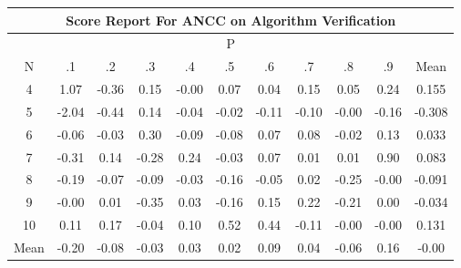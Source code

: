 \documentclass[11pt,a4paper]{report}
\begin{document}
\begin{longtable}{ | c || c | c | c | c | c | c | c | c | c || c |}
\hline
\multicolumn{11}{|c|}{ Score Report For ANCC on Algorithm Verification} \\
\hline
\multicolumn{11}{|c|}{ P } \\
\hline
N & .1 & .2 & .3 & .4 & .5 & .6 & .7 & .8 & .9 & Mean\\
 \hline
 \hline
 \endhead
  4 &  \cellcolor[HTML]{E7E7FF} 1.07 &  \cellcolor[HTML]{FFF7F7} -0.36 &  \cellcolor[HTML]{FFFFFF} 0.15 &  \cellcolor[HTML]{FFFFFF} -0.00 &  \cellcolor[HTML]{FFFFFF} 0.07 &  \cellcolor[HTML]{FFFFFF} 0.04 &  \cellcolor[HTML]{FFFFFF} 0.15 &  \cellcolor[HTML]{FFFFFF} 0.05 &  \cellcolor[HTML]{F7F7FF} 0.24 & 0.155 \\
  5 &  \cellcolor[HTML]{FFCFCF} -2.04 &  \cellcolor[HTML]{FFF7F7} -0.44 &  \cellcolor[HTML]{FFFFFF} 0.14 &  \cellcolor[HTML]{FFFFFF} -0.04 &  \cellcolor[HTML]{FFFFFF} -0.02 &  \cellcolor[HTML]{FFFFFF} -0.11 &  \cellcolor[HTML]{FFFFFF} -0.10 &  \cellcolor[HTML]{FFFFFF} -0.00 &  \cellcolor[HTML]{FFF7F7} -0.16 & -0.308 \\
  6 &  \cellcolor[HTML]{FFFFFF} -0.06 &  \cellcolor[HTML]{FFFFFF} -0.03 &  \cellcolor[HTML]{F7F7FF} 0.30 &  \cellcolor[HTML]{FFFFFF} -0.09 &  \cellcolor[HTML]{FFFFFF} -0.08 &  \cellcolor[HTML]{FFFFFF} 0.07 &  \cellcolor[HTML]{FFFFFF} 0.08 &  \cellcolor[HTML]{FFFFFF} -0.02 &  \cellcolor[HTML]{FFFFFF} 0.13 & 0.033 \\
  7 &  \cellcolor[HTML]{FFF7F7} -0.31 &  \cellcolor[HTML]{FFFFFF} 0.14 &  \cellcolor[HTML]{FFF7F7} -0.28 &  \cellcolor[HTML]{F7F7FF} 0.24 &  \cellcolor[HTML]{FFFFFF} -0.03 &  \cellcolor[HTML]{FFFFFF} 0.07 &  \cellcolor[HTML]{FFFFFF} 0.01 &  \cellcolor[HTML]{FFFFFF} 0.01 &  \cellcolor[HTML]{E7E7FF} 0.90 & 0.083 \\
  8 &  \cellcolor[HTML]{FFF7F7} -0.19 &  \cellcolor[HTML]{FFFFFF} -0.07 &  \cellcolor[HTML]{FFFFFF} -0.09 &  \cellcolor[HTML]{FFFFFF} -0.03 &  \cellcolor[HTML]{FFF7F7} -0.16 &  \cellcolor[HTML]{FFFFFF} -0.05 &  \cellcolor[HTML]{FFFFFF} 0.02 &  \cellcolor[HTML]{FFF7F7} -0.25 &  \cellcolor[HTML]{FFFFFF} -0.00 & -0.091 \\
  9 &  \cellcolor[HTML]{FFFFFF} -0.00 &  \cellcolor[HTML]{FFFFFF} 0.01 &  \cellcolor[HTML]{FFF7F7} -0.35 &  \cellcolor[HTML]{FFFFFF} 0.03 &  \cellcolor[HTML]{FFFFFF} -0.16 &  \cellcolor[HTML]{FFFFFF} 0.15 &  \cellcolor[HTML]{F7F7FF} 0.22 &  \cellcolor[HTML]{FFF7F7} -0.21 &  \cellcolor[HTML]{FFFFFF} 0.00 & -0.034 \\
  10 &  \cellcolor[HTML]{FFFFFF} 0.11 &  \cellcolor[HTML]{F7F7FF} 0.17 &  \cellcolor[HTML]{FFFFFF} -0.04 &  \cellcolor[HTML]{FFFFFF} 0.10 &  \cellcolor[HTML]{EFEFFF} 0.52 &  \cellcolor[HTML]{F7F7FF} 0.44 &  \cellcolor[HTML]{FFFFFF} -0.11 &  \cellcolor[HTML]{FFFFFF} -0.00 &  \cellcolor[HTML]{FFFFFF} -0.00 & 0.131 \\
 \hline
 \hline
Mean &  \cellcolor[HTML]{FFF7F7} -0.20 &  \cellcolor[HTML]{FFFFFF} -0.08 &  \cellcolor[HTML]{FFFFFF} -0.03 &  \cellcolor[HTML]{FFFFFF} 0.03 &  \cellcolor[HTML]{FFFFFF} 0.02 &  \cellcolor[HTML]{FFFFFF} 0.09 &  \cellcolor[HTML]{FFFFFF} 0.04 &  \cellcolor[HTML]{FFFFFF} -0.06 &  \cellcolor[HTML]{FFFFFF} 0.16 &  \cellcolor[HTML]{FFFFFF} -0.00
\end{longtable}
\end{document}
